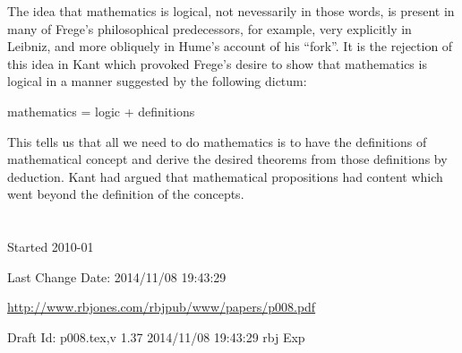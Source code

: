 \documentclass[10pt,titlepage]{book}
\begin{document}
The idea that mathematics is logical, not nevessarily in those words, is present in many of Frege's philosophical predecessors, for example, very explicitly in Leibniz, and more obliquely in Hume's account of his ``fork''.
It is the rejection of this idea in Kant which provoked Frege's desire to show that mathematics is logical in a manner suggested by the following dictum:

{\large
\begin{centering}
  mathematics = logic + definitions
\end{centering}
}

This tells us that all we need to do mathematics is to have the definitions of mathematical concept and derive the desired theorems from those definitions by deduction.
Kant had argued that mathematical propositions had content which went beyond the definition of the concepts.



\chapter{}

\backmatter

%




\label{index}
{\twocolumn[]
{\small\printindex}}

\vfill

\tiny{
Started 2010-01

Last Change $ $Date: 2014/11/08 19:43:29 $ $

\href{http://www.rbjones.com/rbjpub/www/papers/p008.pdf}{http://www.rbjones.com/rbjpub/www/papers/p008.pdf}

Draft $ $Id: p008.tex,v 1.37 2014/11/08 19:43:29 rbj Exp $ $
}%
\end{document}
